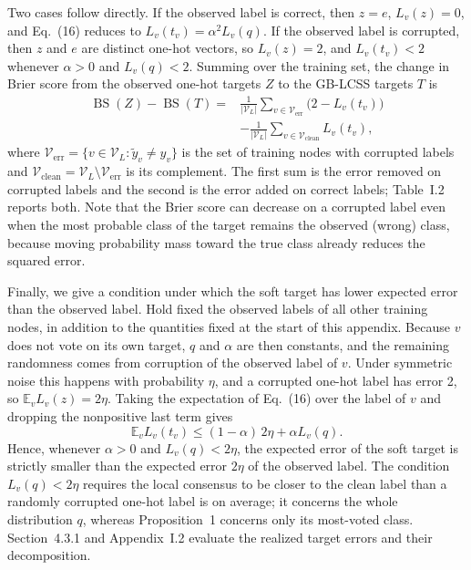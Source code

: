 \documentclass[10pt,letterpaper,nopreprintline]{elsarticle}
\begin{document}
Two cases follow directly. If the observed label is correct, then \(z=e\), \(L_v(z)=0\), and Eq.~(16) reduces to \(L_v(t_v)=\alpha^2L_v(q)\). If the observed label is corrupted, then \(z\) and \(e\) are distinct one-hot vectors, so \(L_v(z)=2\), and \(L_v(t_v)<2\) whenever \(\alpha>0\) and \(L_v(q)<2\). Summing over the training set, the change in Brier score from the observed one-hot targets \(Z\) to the GB-LCSS targets \(T\) is
\begin{equation}\label{eq:H.5}
\begin{aligned}
\operatorname{BS}(Z)-\operatorname{BS}(T)={}&
\frac{1}{|\mathcal{V}_L|}\sum_{v\in\mathcal{V}_{\mathrm{err}}}\bigl(2-L_v(t_v)\bigr)\\
&-\frac{1}{|\mathcal{V}_L|}\sum_{v\in\mathcal{V}_{\mathrm{clean}}}L_v(t_v),
\end{aligned}
\end{equation}
where \(\mathcal{V}_{\mathrm{err}}=\{v\in\mathcal{V}_L:\widetilde y_v\ne y_v\}\) is the set of training nodes with corrupted labels and \(\mathcal{V}_{\mathrm{clean}}=\mathcal{V}_L\setminus\mathcal{V}_{\mathrm{err}}\) is its complement. The first sum is the error removed on corrupted labels and the second is the error added on correct labels; Table~I.2 reports both. Note that the Brier score can decrease on a corrupted label even when the most probable class of the target remains the observed (wrong) class, because moving probability mass toward the true class already reduces the squared error.

Finally, we give a condition under which the soft target has lower expected error than the observed label. Hold fixed the observed labels of all other training nodes, in addition to the quantities fixed at the start of this appendix. Because \(v\) does not vote on its own target, \(q\) and \(\alpha\) are then constants, and the remaining randomness comes from corruption of the observed label of \(v\). Under symmetric noise this happens with probability \(\eta\), and a corrupted one-hot label has error 2, so \(\mathbb{E}_v L_v(z)=2\eta\). Taking the expectation of Eq.~(16) over the label of \(v\) and dropping the nonpositive last term gives
\begin{equation}\label{eq:H.6}
\mathbb{E}_v L_v(t_v)\leq(1-\alpha)\,2\eta+\alpha L_v(q).
\end{equation}
Hence, whenever \(\alpha>0\) and \(L_v(q)<2\eta\), the expected error of the soft target is strictly smaller than the expected error \(2\eta\) of the observed label. The condition \(L_v(q)<2\eta\) requires the local consensus to be closer to the clean label than a randomly corrupted one-hot label is on average; it concerns the whole distribution \(q\), whereas Proposition~1 concerns only its most-voted class. Section~4.3.1 and Appendix~I.2 evaluate the realized target errors and their decomposition.
\end{document}
